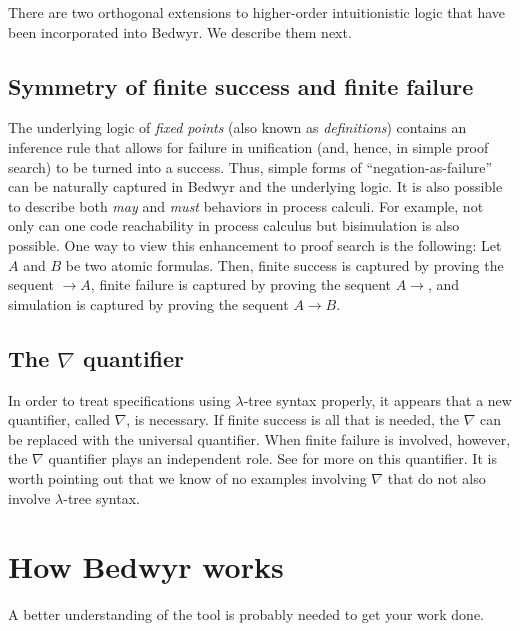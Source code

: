 \documentclass{article}
\providecommand{\texorpdfstring}[2]{#1}
\begin{document}
\bigskip
There are two orthogonal extensions to higher-order intuitionistic
logic that have been incorporated into Bedwyr.   We describe them next.

\subsection{Symmetry of finite success and finite failure}

The underlying logic of {\em fixed points} (also known as {\em
definitions})
\cite{girard92mail,schroeder-Heister93lics,mcdowell03tcs,momigliano03types}
contains an inference rule that allows for failure in unification
(and, hence, in simple proof search) to be turned into a success.
Thus, simple forms of ``negation-as-failure'' can be naturally
captured in Bedwyr and the underlying logic.  It is also possible to
describe both {\em may} and {\em must} behaviors in process calculi.
For example, not only can one code reachability in process calculus
but bisimulation is also possible.  One way to view this enhancement
to proof search is the following: Let $A$ and $B$ be two atomic
formulas.  Then, finite success is captured by proving the sequent
$\longrightarrow A$, finite failure is captured by proving the sequent
$A\longrightarrow$, and simulation is captured by proving the sequent
$A\longrightarrow B$.

\subsection{The \texorpdfstring{$\nabla$}{nabla} quantifier}

In order to treat specifications using $\lambda$-tree syntax
properly, it appears that a new quantifier, called $\nabla$, is
necessary.  If finite success is all that is needed, the $\nabla$ can
be replaced with the universal quantifier.  When finite failure is
involved, however, the $\nabla$ quantifier plays an independent role.
See \cite{miller05tocl,tiu04phd,tiu05concur} for more on this
quantifier.  It is worth pointing out that we know of no examples
involving $\nabla$ that do not also involve $\lambda$-tree syntax.


\section{How Bedwyr works}
\label{sec:howto}

A better understanding of the tool is probably needed to get your work
done.
\end{document}
